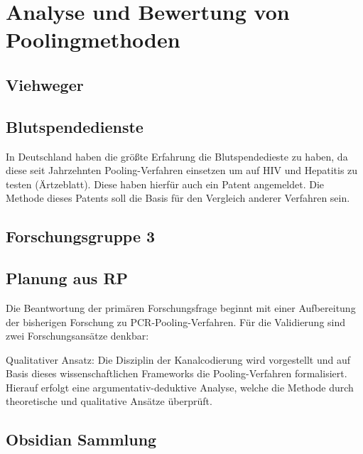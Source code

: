 \chapter{Analyse und Bewertung von Poolingmethoden}
\section{Viehweger}



\section{Blutspendedienste}
In Deutschland haben die größte Erfahrung die Blutspendedieste zu haben, da diese seit Jahrzehnten Pooling-Verfahren einsetzen um auf HIV und Hepatitis zu testen (Ärtzeblatt). Diese haben hierfür auch ein Patent angemeldet. Die Methode dieses Patents soll die Basis für den Vergleich anderer Verfahren sein.

\section{Forschungsgruppe 3}



\section{Planung aus RP}
Die Beantwortung der primären Forschungsfrage beginnt mit einer Aufbereitung der bisherigen Forschung zu PCR-Pooling-Verfahren.
Für die Validierung sind zwei Forschungsansätze denkbar:

Qualitativer Ansatz:
Die Disziplin der Kanalcodierung wird vorgestellt und auf Basis dieses wissenschaftlichen Frameworks die Pooling-Verfahren formalisiert.
Hierauf erfolgt eine argumentativ-deduktive Analyse, welche die Methode durch theoretische und qualitative Ansätze überprüft.


\section{Obsidian Sammlung}
